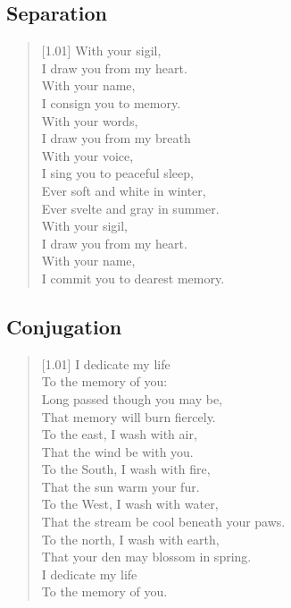 \subsection{Separation}

\begin{verse}[1.01\textwidth]
With your sigil,\\
\vin I draw you from my heart.\\
With your name,\\
\vin I consign you to memory.\\
With your words,\\
\vin I draw you from my breath\\
With your voice,\\
\vin I sing you to peaceful sleep,\\
Ever soft and white in winter,\\
\vin Ever svelte and gray in summer.\\
With your sigil,\\
\vin I draw you from my heart.\\
With your name,\\
\vin I commit you to dearest memory.\\
\end{verse}
\newpage

\subsection{Conjugation}

\begin{verse}[1.01\textwidth]
I dedicate my life\\
\vin To the memory of you:\\
Long passed though you may be,\\
\vin That memory will burn fiercely.\\
To the east, I wash with air,\\
\vin That the wind be with you.\\
To the South, I wash with fire,\\
\vin That the sun warm your fur.\\
To the West, I wash with water,\\
\vin That the stream be cool beneath your paws.\\
To the north, I wash with earth,\\
\vin That your den may blossom in spring.\\
I dedicate my life\\
\vin To the memory of you.\\
\end{verse}
\newpage

